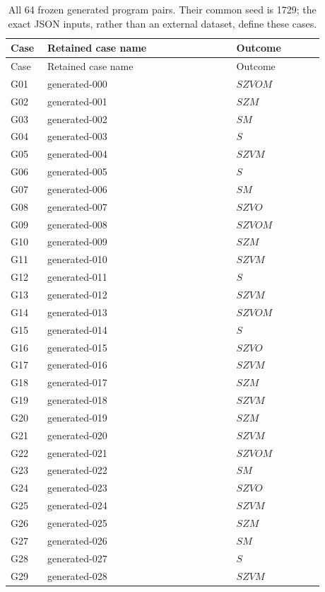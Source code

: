 \begin{longtable}{@{}p{0.09\linewidth}p{0.54\linewidth}p{0.25\linewidth}@{}}
\caption{All 64 frozen generated program pairs. Their common seed is 1729; the exact JSON inputs, rather than an external dataset, define these cases.}\label{tab:diagnostic-catalog}\\
\toprule Case & Retained case name & Outcome\\\midrule\endfirsthead
\toprule Case & Retained case name & Outcome\\\midrule\endhead
\bottomrule\endfoot
G01 & generated-000 & $SZVOM$\\
G02 & generated-001 & $SZM$\\
G03 & generated-002 & $SM$\\
G04 & generated-003 & $S$\\
G05 & generated-004 & $SZVM$\\
G06 & generated-005 & $S$\\
G07 & generated-006 & $SM$\\
G08 & generated-007 & $SZVO$\\
G09 & generated-008 & $SZVOM$\\
G10 & generated-009 & $SZM$\\
G11 & generated-010 & $SZVM$\\
G12 & generated-011 & $S$\\
G13 & generated-012 & $SZVM$\\
G14 & generated-013 & $SZVOM$\\
G15 & generated-014 & $S$\\
G16 & generated-015 & $SZVO$\\
G17 & generated-016 & $SZVM$\\
G18 & generated-017 & $SZM$\\
G19 & generated-018 & $SZVM$\\
G20 & generated-019 & $SZM$\\
G21 & generated-020 & $SZVM$\\
G22 & generated-021 & $SZVOM$\\
G23 & generated-022 & $SM$\\
G24 & generated-023 & $SZVO$\\
G25 & generated-024 & $SZVM$\\
G26 & generated-025 & $SZM$\\
G27 & generated-026 & $SM$\\
G28 & generated-027 & $S$\\
G29 & generated-028 & $SZVM$\\

\end{longtable}
